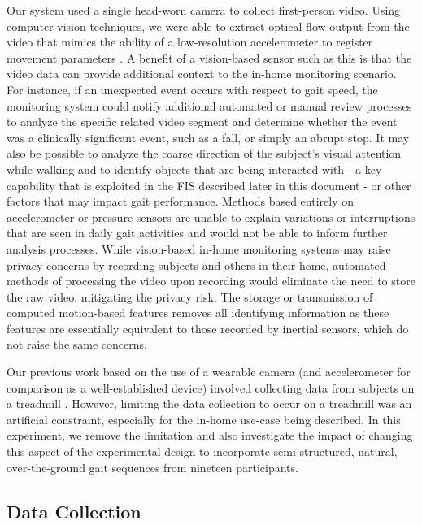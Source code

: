\documentclass[12pt]{report}
\begin{document}
Our system used a single head-worn camera to collect first-person video. Using computer vision techniques, we were able to extract optical flow output from the video that mimics the ability of a low-resolution accelerometer to register movement parameters \cite{Schneider2017PreliminaryProcessing}. A benefit of a vision-based sensor such as this is that the video data can provide additional context to the in-home monitoring scenario. For instance, if an unexpected event occurs with respect to gait speed, the monitoring system could notify additional automated or manual review processes to analyze the specific related video segment and determine whether the event was a clinically significant event, such as a fall, or simply an abrupt stop. It may also be possible to analyze the coarse direction of the subject's visual attention while walking and to identify objects that are being interacted with - a key capability that is exploited in the FIS described later in this document - or other factors that may impact gait performance. Methods based entirely on accelerometer or pressure sensors are unable to explain variations or interruptions that are seen in daily gait activities and would not be able to inform further analysis processes. While vision-based in-home monitoring systems may raise privacy concerns by recording subjects and others in their home, automated methods of processing the video upon recording would eliminate the need to store the raw video, mitigating the privacy risk. The storage or transmission of computed motion-based features removes all identifying information as these features are essentially equivalent to those recorded by inertial sensors, which do not raise the same concerns.

Our previous work based on the use of a wearable camera (and accelerometer for comparison as a well-established device) involved collecting data from subjects on a treadmill \cite{Schneider2017}. However, limiting the data collection to occur on a treadmill was an artificial constraint, especially for the in-home use-case being described. In this experiment, we remove the limitation and also investigate the impact of changing this aspect of the experimental design to incorporate semi-structured, natural, over-the-ground gait sequences from nineteen participants.

\subsection{Data Collection}
\end{document}
